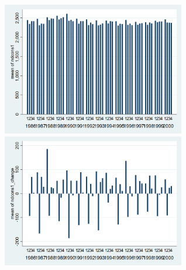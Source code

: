 \documentclass[12pt,a4paper]{article}
\begin{document}
\begin{center}
\includegraphics[width=8cm]{ndcons1_quarterly.png}
\includegraphics[width=8cm]{ndcons1_change_quarterly.png}\\
\end{center}
\end{document}
